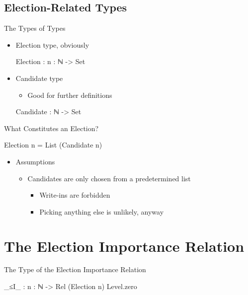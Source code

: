 \documentclass{beamer}
\begin{document}
\subsection{Election-Related Types}

\begin{frame}{The Types of Types}
\begin{itemize}
  \item Election type, obviously
\begin{code}
Election : {n : ℕ} -> Set
\end{code}
  \item Candidate type
  \begin{itemize}
    \item Good for further definitions
  \end{itemize}
\begin{code}
Candidate : ℕ -> Set
\end{code}
\end{itemize}
\end{frame}

\begin{frame}{What Constitutes an Election?}
\begin{code}
Election {n} = List (Candidate n)
\end{code}

\begin{itemize}
  \item Assumptions
  \begin{itemize}
    \item Candidates are only chosen from a predetermined list
    \begin{itemize}
      \item Write-ins are forbidden
      \item Picking anything else is unlikely, anyway
    \end{itemize}
  \end{itemize}
\end{itemize}
\end{frame}

\section{The Election Importance Relation}

\begin{frame}{The Type of the Election Importance Relation}
\begin{code}
_≤I_ : {n : ℕ} -> Rel (Election {n}) Level.zero
\end{code}
\end{frame}
\end{document}
